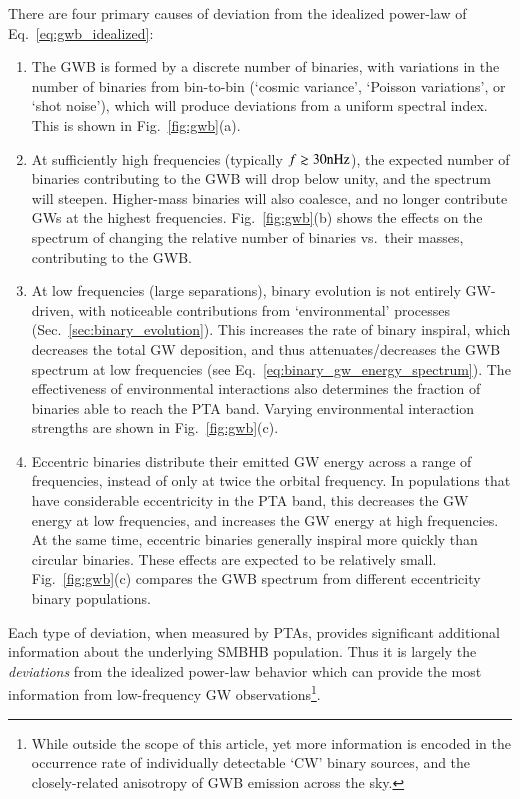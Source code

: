 \documentclass[onecolumn,authoryear]{els-mrw}
\begin{document}
There are four primary causes of deviation from the idealized power-law of Eq.~\ref{eq:gwb_idealized}:
\begin{enumerate}
    \item The GWB is formed by a discrete number of binaries, with variations in the number of binaries from bin-to-bin (`cosmic variance', `Poisson variations', or `shot noise'), which will produce deviations from a uniform spectral index.  This is shown in Fig.~\ref{fig:gwb}(a).
    \item At sufficiently high frequencies (typically $f \gtrsim 30 \textrm{nHz}$), the expected number of binaries contributing to the GWB will drop below unity, and the spectrum will steepen.  Higher-mass binaries will also coalesce, and no longer contribute GWs at the highest frequencies.  Fig.~\ref{fig:gwb}(b) shows the effects on the spectrum of changing the relative number of binaries vs.~their masses, contributing to the GWB.
    \item At low frequencies (large separations), binary evolution is not entirely GW-driven, with noticeable contributions from `environmental' processes (Sec.~\ref{sec:binary_evolution}).  This increases the rate of binary inspiral, which decreases the total GW deposition, and thus attenuates/decreases the GWB spectrum at low frequencies (see Eq.~\ref{eq:binary_gw_energy_spectrum}).  The effectiveness of environmental interactions also determines the fraction of binaries able to reach the PTA band.  Varying environmental interaction strengths are shown in Fig.~\ref{fig:gwb}(c).
    \item Eccentric binaries distribute their emitted GW energy across a range of frequencies, instead of only at twice the orbital frequency.  In populations that have considerable eccentricity in the PTA band, this decreases the GW energy at low frequencies, and increases the GW energy at high frequencies.  At the same time, eccentric binaries generally inspiral more quickly than circular binaries.  These effects are expected to be relatively small.  Fig.~\ref{fig:gwb}(c) compares the GWB spectrum from different eccentricity binary populations.
\end{enumerate}
Each type of deviation, when measured by PTAs, provides significant additional information about the underlying SMBHB population.  Thus it is largely the \textit{deviations} from the idealized power-law behavior which can provide the most information from low-frequency GW observations\footnote{While outside the scope of this article, yet more information is encoded in the occurrence rate of individually detectable `CW' binary sources, and the closely-related anisotropy of GWB emission across the sky.}.
\end{document}
